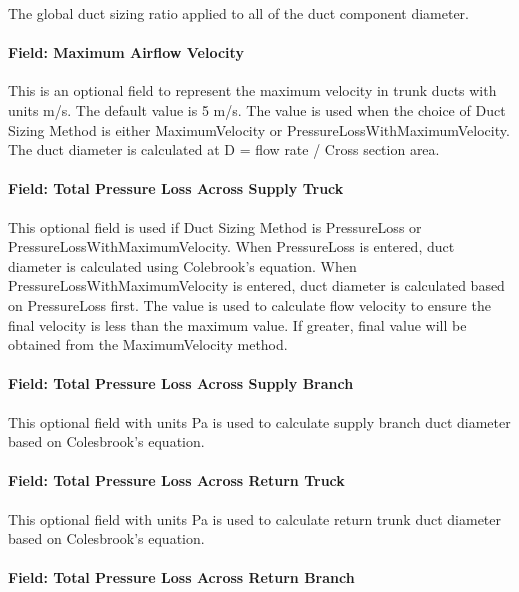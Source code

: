 The global duct sizing ratio applied to all of the duct component diameter.

\paragraph{Field: Maximum Airflow Velocity}\label{maximum-airflow-velocity}

This is an optional field to represent the maximum velocity in trunk ducts with units m/s. The default value is 5 m/s. The value is used when the choice of Duct Sizing Method is either MaximumVelocity or PressureLossWithMaximumVelocity. The duct diameter is calculated at D = flow rate / Cross section area.

\paragraph{Field: Total Pressure Loss Across Supply Truck}\label{total-pressure-loss-across-supply-truck}

This optional field is used if Duct Sizing Method is PressureLoss or PressureLossWithMaximumVelocity. When PressureLoss is entered, duct diameter is calculated using Colebrook's equation.  When PressureLossWithMaximumVelocity is entered, duct diameter is calculated based on PressureLoss first. The value is used to calculate flow velocity to ensure the final velocity is less than the maximum value. If greater, final value will be obtained from the MaximumVelocity method.

\paragraph{Field: Total Pressure Loss Across Supply Branch}\label{total-pressure-loss-across-supply-branch}

This optional field with units Pa is used to calculate supply branch duct diameter based on Colesbrook's equation.

\paragraph{Field: Total Pressure Loss Across Return Truck}\label{total-pressure-loss-across-return-truck}

This optional field with units Pa is used to calculate return trunk duct diameter based on Colesbrook's equation.

\paragraph{Field: Total Pressure Loss Across Return Branch}\label{total-pressure-loss-across-return-branch}

